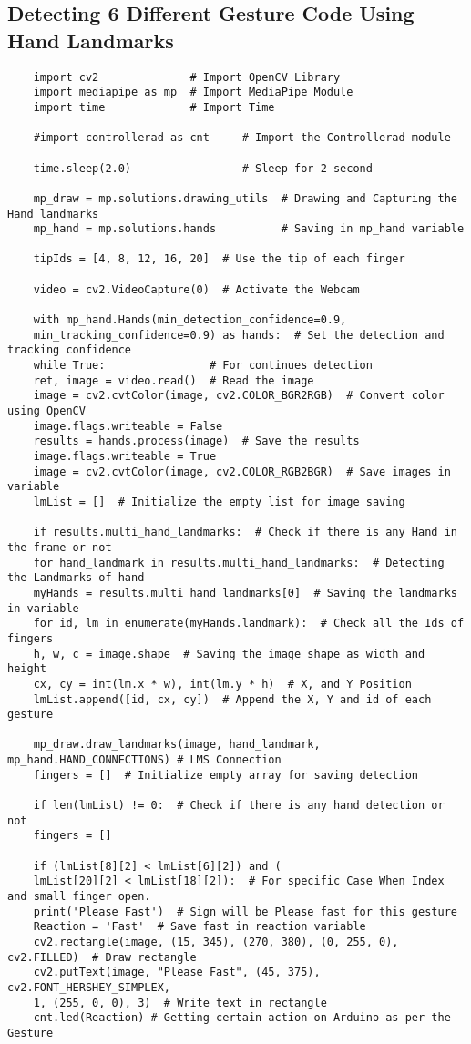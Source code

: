 \subsection{Detecting 6 Different Gesture Code Using Hand Landmarks}
\begin{verbatim}
	import cv2              # Import OpenCV Library
	import mediapipe as mp  # Import MediaPipe Module
	import time             # Import Time
	
	#import controllerad as cnt     # Import the Controllerad module
	
	time.sleep(2.0)                 # Sleep for 2 second
	
	mp_draw = mp.solutions.drawing_utils  # Drawing and Capturing the Hand landmarks
	mp_hand = mp.solutions.hands          # Saving in mp_hand variable
	
	tipIds = [4, 8, 12, 16, 20]  # Use the tip of each finger
	
	video = cv2.VideoCapture(0)  # Activate the Webcam
	
	with mp_hand.Hands(min_detection_confidence=0.9,
	min_tracking_confidence=0.9) as hands:  # Set the detection and tracking confidence
	while True:                # For continues detection
	ret, image = video.read()  # Read the image
	image = cv2.cvtColor(image, cv2.COLOR_BGR2RGB)  # Convert color using OpenCV
	image.flags.writeable = False
	results = hands.process(image)  # Save the results
	image.flags.writeable = True
	image = cv2.cvtColor(image, cv2.COLOR_RGB2BGR)  # Save images in variable
	lmList = []  # Initialize the empty list for image saving
	
	if results.multi_hand_landmarks:  # Check if there is any Hand in the frame or not
	for hand_landmark in results.multi_hand_landmarks:  # Detecting the Landmarks of hand
	myHands = results.multi_hand_landmarks[0]  # Saving the landmarks in variable
	for id, lm in enumerate(myHands.landmark):  # Check all the Ids of fingers
	h, w, c = image.shape  # Saving the image shape as width and height
	cx, cy = int(lm.x * w), int(lm.y * h)  # X, and Y Position
	lmList.append([id, cx, cy])  # Append the X, Y and id of each gesture
	
	mp_draw.draw_landmarks(image, hand_landmark, mp_hand.HAND_CONNECTIONS) # LMS Connection
	fingers = []  # Initialize empty array for saving detection
	
	if len(lmList) != 0:  # Check if there is any hand detection or not
	fingers = []
	
	if (lmList[8][2] < lmList[6][2]) and (
	lmList[20][2] < lmList[18][2]):  # For specific Case When Index and small finger open.
	print('Please Fast')  # Sign will be Please fast for this gesture
	Reaction = 'Fast'  # Save fast in reaction variable
	cv2.rectangle(image, (15, 345), (270, 380), (0, 255, 0), cv2.FILLED)  # Draw rectangle 
	cv2.putText(image, "Please Fast", (45, 375), cv2.FONT_HERSHEY_SIMPLEX,
	1, (255, 0, 0), 3)  # Write text in rectangle
	cnt.led(Reaction) # Getting certain action on Arduino as per the Gesture
	

\end{verbatim}

